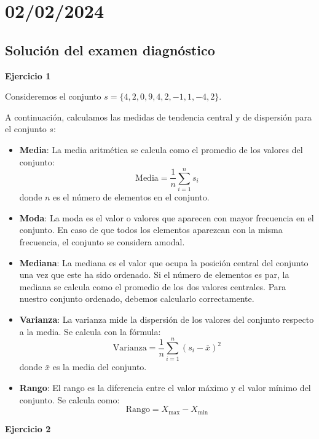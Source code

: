 \documentclass{article}
\begin{document}
\section{02/02/2024}

\subsection{Solución del examen diagnóstico}

\textbf{Ejercicio 1}

Consideremos el conjunto $s = \{4, 2, 0, 9, 4, 2, -1, 1, -4, 2\}$.

A continuación, calculamos las medidas de tendencia central y de dispersión para el conjunto $s$:

\begin{itemize}
    \item \textbf{Media}: La media aritmética se calcula como el promedio de los valores del conjunto:
          \[
              \text{Media} = \frac{1}{n} \sum_{i=1}^{n}s_i
          \]
          donde $n$ es el número de elementos en el conjunto.

    \item \textbf{Moda}: La moda es el valor o valores que aparecen con mayor frecuencia en el conjunto. En caso de que todos los elementos aparezcan con la misma frecuencia, el conjunto se considera amodal.

    \item \textbf{Mediana}: La mediana es el valor que ocupa la posición central del conjunto una vez que este ha sido ordenado. Si el número de elementos es par, la mediana se calcula como el promedio de los dos valores centrales. Para nuestro conjunto ordenado, debemos calcularlo correctamente.

    \item \textbf{Varianza}: La varianza mide la dispersión de los valores del conjunto respecto a la media. Se calcula con la fórmula:
          \[
              \text{Varianza} = \frac{1}{n} \sum_{i=1}^{n}(s_i - \bar{x})^2
          \]
          donde $\bar{x}$ es la media del conjunto.

    \item \textbf{Rango}: El rango es la diferencia entre el valor máximo y el valor mínimo del conjunto. Se calcula como:
          \[
              \text{Rango} = X_{\text{max}} - X_{\text{min}}
          \]
\end{itemize}

\textbf{Ejercicio 2}
\end{document}
